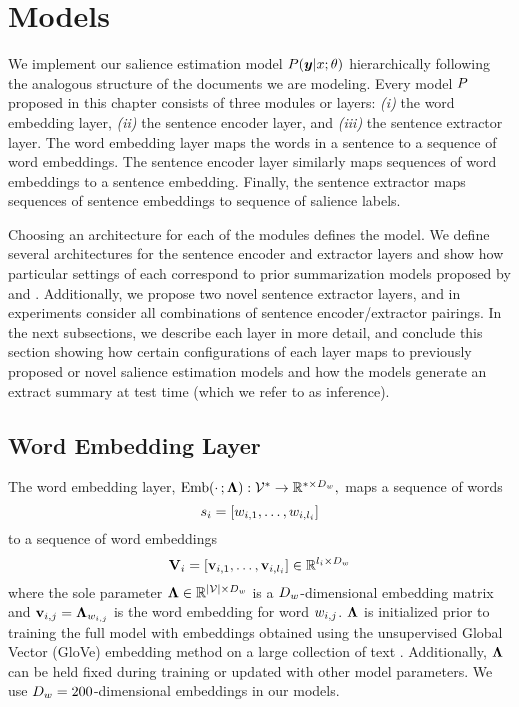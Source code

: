 \section{Models}

We implement our salience estimation model $P(\boldsymbol{y}|x;\theta)$
hierarchically following the analogous structure of the documents we are
modeling.  Every model $P$ proposed in this chapter consists of three
modules or layers: \textit{(i)} the word embedding layer, \textit{(ii)} the
sentence encoder layer, and \textit{(iii)} the sentence extractor layer.  The
word embedding layer maps the words in a sentence to a sequence of word
embeddings. The sentence encoder layer similarly maps sequences of word
embeddings to a sentence embedding. Finally, the sentence extractor maps
sequences of sentence embeddings to sequence of salience labels.

Choosing an architecture for each of the modules defines the model. We define
several architectures for the sentence encoder and extractor layers and show
how particular settings of each correspond to prior summarization models
proposed by \citet{cheng2016neural} and \citet{nallapati2017summarunner}.
Additionally, we propose two novel sentence extractor layers, and in
experiments consider all combinations of sentence encoder/extractor pairings.
In the next subsections, we describe each layer in more detail, and conclude
this section showing how certain configurations of each layer maps to
previously proposed or novel salience estimation models and how the models
generate an extract summary at test time (which we refer to as inference).

\subsection{Word Embedding Layer}

The word embedding layer, $\operatorname{Emb}(\cdot\,;\boldsymbol{\Lambda}) : \mathcal{V}^*
\rightarrow \mathbb{R}^{* \times D_{w}},$ maps a sequence of words 
\[
    s_i = \left[w_{i,1},\ldots, w_{i,l_i}\right]
\] 
to a sequence of word embeddings 
\[
\mathbf{V}_i = \left[ \mathbf{v}_{i,1}, \ldots, \mathbf{v}_{i,l_i} \right]
    \in \mathbb{R}^{l_i \times D_{w}}
\]
where the sole parameter $\boldsymbol{\Lambda} \in \mathbb{R}^{|\mathcal{V}| \times
D_{w}}$ is a $D_{w}$-dimensional embedding matrix and $\mathbf{v}_{i,j} =
\boldsymbol{\Lambda}_{w_{i,j}}$ is the word embedding for word $w_{i,j}$.
$\boldsymbol{\Lambda}$ is initialized prior to training the full model with embeddings
obtained using the unsupervised Global Vector (GloVe) embedding method on a
large collection of text \citep{pennington2014glove}.  Additionally,
$\boldsymbol{\Lambda}$ can be held fixed during training or updated with other model
parameters. We use $D_{w} = 200$-dimensional embeddings in our models.


